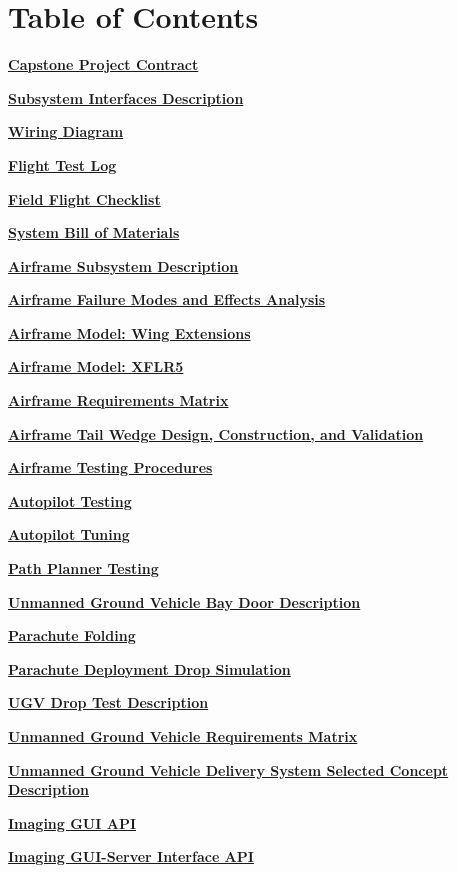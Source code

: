\documentclass[]{article}
\newcommand{\pdflink}[2]{
\hyperlink{#1.1}{\textbf{#2}}
}
\begin{document}



\section*{Table of Contents}

\pdflink{proj_cont}{Capstone Project Contract}

\pdflink{sid}{Subsystem Interfaces Description}

\pdflink{wd}{Wiring Diagram}

\pdflink{fl}{Flight Test Log}

\pdflink{ffcl}{Field Flight Checklist}

\pdflink{abm}{System Bill of Materials}

\pdflink{add}{Airframe Subsystem Description}

\pdflink{afmea}{Airframe Failure Modes and Effects Analysis}

\pdflink{amwe}{Airframe Model: Wing Extensions}

\pdflink{amxflr}{Airframe Model: XFLR5}

\pdflink{arq}{Airframe Requirements Matrix}

\pdflink{atwt}{Airframe Tail Wedge Design, Construction, and Validation}

\pdflink{atap}{Airframe Testing Procedures}

\pdflink{atest}{Autopilot Testing}

\pdflink{atune}{Autopilot Tuning}

\pdflink{ppt}{Path Planner Testing}



\pdflink{ugvbdd}{Unmanned Ground Vehicle Bay Door Description}

\pdflink{pf}{Parachute Folding}

\pdflink{pdds}{Parachute Deployment Drop Simulation}

\pdflink{udtd}{UGV Drop Test Description}

\pdflink{ugvrm}{Unmanned Ground Vehicle Requirements Matrix}

\pdflink{ugvdsscd}{Unmanned Ground Vehicle Delivery System Selected Concept Description}

\pdflink{iga}{Imaging GUI API}

\pdflink{igsia}{Imaging GUI-Server Interface API}
\end{document}
